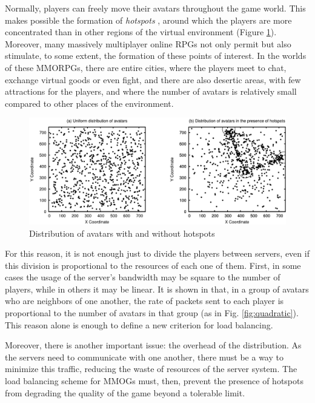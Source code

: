 Normally, players can freely move their avatars throughout the game world. This makes possible the formation of \emph{hotspots} \cite{ahmed2008mol}, around which the players are more concentrated than in other regions of the virtual environment (Figure \ref{fig:avatarsdistribution}). Moreover, many massively multiplayer online RPGs not only permit but also stimulate, to some extent, the formation of these points of interest. In the worlds of these MMORPGs, there are entire cities, where the players meet to chat, exchange virtual goods or even fight, and there are also desertic areas, with few attractions for the players, and where the number of avatars is relatively small compared to other places of the environment.

\begin{figure}
  \centering
  \includegraphics[width=1.0\linewidth]{images/avatarsdistribution}
  \caption{Distribution of avatars with and without hotspots}
  \label{fig:avatarsdistribution}
\end{figure}

For this reason, it is not enough just to divide the players between servers, even if this division is proportional to the resources of each one of them. First, in some cases the usage of the server's bandwidth may be square to the number of players, while in others it may be linear. It is shown in \cite{chen2006gta} that, in a group of avatars who are neighbors of one another, the rate of packets sent to each player is proportional to the number of avatars in that group (as in Fig. \ref{fig:quadratic}). This reason alone is enough to define a new criterion for load balancing.

Moreover, there is another important issue: the overhead of the distribution. As the servers need to communicate with one another, there must be a way to minimize this traffic, reducing the waste of resources of the server system. The load balancing scheme for MMOGs must, then, prevent the presence of hotspots from degrading the quality of the game beyond a tolerable limit.

